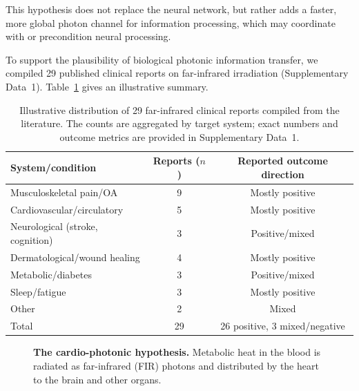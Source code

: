 \documentclass[11pt,a4paper]{article}
\begin{document}
This hypothesis does not replace the neural network, but rather adds a faster, more global photon channel for information processing, which may coordinate with or precondition neural processing.

To support the plausibility of biological photonic information transfer, we compiled 29 published clinical reports on far-infrared irradiation (Supplementary Data~1). Table~\ref{tab:clinical} gives an illustrative summary.

\begin{table}[H]
\centering
\caption{Illustrative distribution of 29 far-infrared clinical reports compiled from the literature. The counts are aggregated by target system; exact numbers and outcome metrics are provided in Supplementary Data~1.}
\label{tab:clinical}
\begin{tabular}{@{}lcc@{}}
\toprule
System/condition & Reports ($n$) & Reported outcome direction \\
\midrule
Musculoskeletal pain/OA & 9 & Mostly positive \\
Cardiovascular/circulatory & 5 & Mostly positive \\
Neurological (stroke, cognition) & 3 & Positive/mixed \\
Dermatological/wound healing & 4 & Mostly positive \\
Metabolic/diabetes & 3 & Positive/mixed \\
Sleep/fatigue & 3 & Mostly positive \\
Other & 2 & Mixed \\
\midrule
Total & 29 & 26 positive, 3 mixed/negative \\
\bottomrule
\end{tabular}
\end{table}

\begin{figure}[H]
\centering
{}
\caption{\textbf{The cardio-photonic hypothesis.} Metabolic heat in the blood is radiated as far-infrared (FIR) photons and distributed by the heart to the brain and other organs.}
\label{fig:cardio}
\end{figure}
\end{document}
